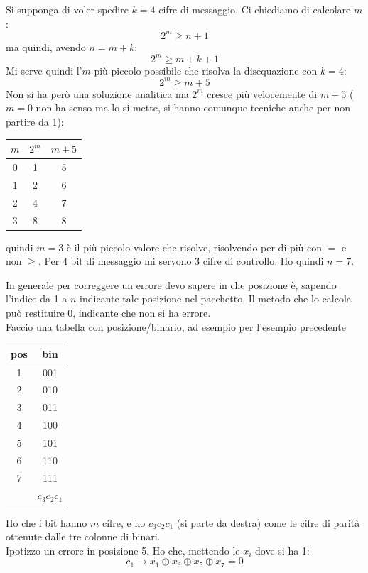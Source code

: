 \documentclass[a4paper,12pt, oneside]{book}
\begin{document}
\begin{esempio}
  Si supponga di voler spedire $k=4$ cifre di messaggio. Ci chiediamo di
  calcolare $m$:
  \[2^m\geq n+1\]
  ma quindi, avendo $n=m+k$:
  \[2^m\geq m+k+1\]
  Mi serve quindi l'$m$ più piccolo possibile che risolva la disequazione con
  $k=4$: 
  \[2^m\geq m+5\]
  Non si ha però una soluzione analitica ma $2^m$ cresce più velocemente di
  $m+5$ ($m=0$ non ha senso ma lo si mette, si hanno comunque tecniche anche per
  non partire da 1):
  \begin{table}[H]
    \centering
    \begin{tabular}{c||c|c}
      $m$& $2^m$ & $m+5$\\
      \hline
      \hline
      0 & 1 & 5\\
      1 & 2 & 6\\
      2 & 4 & 7\\
      3 & 8 & 8
    \end{tabular}
  \end{table}
  quindi $m=3$ è il più piccolo valore che risolve, risolvendo per di più con
  $=$ e non $\geq$. Per 4 bit di messaggio mi servono 3 cifre di controllo. Ho
  quindi $n=7$.
\end{esempio}
In generale per correggere un errore devo sapere in che posizione è, sapendo
l'indice da 1 a $n$ indicante tale posizione nel pacchetto. Il metodo che lo
calcola può restituire 0, indicante che non si ha errore.\\
Faccio una tabella con posizione/binario, ad esempio per l'esempio precedente
\begin{table}[H]
  \centering
  \begin{tabular}{c|c}
    pos& bin \\
    \hline     
    1 & 001\\
    2 & 010\\
    3 &011\\
    4&100\\
    5&101\\
    6&110\\
    7&111\\
    \hline
    \hline
    &   $c_3c_2c_1$
  \end{tabular}
\end{table}
Ho che i bit hanno $m$ cifre, e ho $c_3c_2c_1$ (si parte da destra) come le
cifre di parità ottenute dalle tre colonne di binari.\\
Ipotizzo un errore in posizione 5. Ho che, mettendo le $x_i$ dove si ha 1:
\[c_1\to x_1\oplus x_3\oplus x_5 \oplus x_7=0\]
\end{document}
